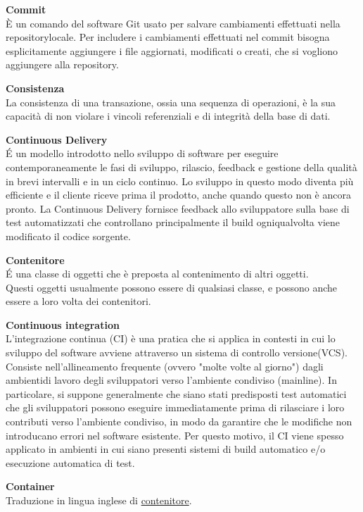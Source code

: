 \documentclass[a4paper, oneside, openany, dvipsnames, table, 12pt]{article}
\begin{document}
\textbf{Commit} \\
È un comando del software Git usato per salvare cambiamenti effettuati nella repository\glo locale. Per includere i cambiamenti effettuati nel commit bisogna esplicitamente aggiungere i file aggiornati, modificati o creati, che si vogliono aggiungere alla repository.

\textbf{Consistenza} \\
La consistenza di una transazione, ossia una sequenza di operazioni, è la sua capacità di non violare i vincoli referenziali e di integrità della base di dati.

\textbf{Continuous Delivery} \\
\'E un modello introdotto nello sviluppo di software per eseguire contemporaneamente le fasi di sviluppo, rilascio, feedback e gestione della qualità in brevi intervalli e in un ciclo continuo. Lo sviluppo in questo modo diventa più efficiente e il cliente riceve prima il prodotto, anche quando questo non è ancora pronto. La Continuous Delivery fornisce feedback allo sviluppatore sulla base di test automatizzati che controllano principalmente il build ogniqualvolta viene modificato il codice sorgente.

\label{par:container}
\textbf{Contenitore} \\
\'E una classe di oggetti che è preposta al contenimento di altri oggetti. \\ 
Questi oggetti usualmente possono essere di qualsiasi classe, e possono anche essere a loro volta dei contenitori.

\textbf{Continuous integration} \\
L'integrazione continua (CI) è una pratica che si applica in contesti in cui lo sviluppo del software avviene attraverso un sistema di controllo versione\glo (VCS\glo). Consiste nell'allineamento frequente (ovvero "molte volte al giorno") dagli ambienti\glo di lavoro degli sviluppatori verso l'ambiente condiviso (mainline).
In particolare, si suppone generalmente che siano stati predisposti test automatici che gli sviluppatori possono eseguire immediatamente prima di rilasciare i loro contributi verso l'ambiente condiviso, in modo da garantire che le modifiche non introducano errori nel software esistente. Per questo motivo, il CI viene spesso applicato in ambienti in cui siano presenti sistemi di build automatico e/o esecuzione automatica di test.


\textbf{Container} \\
Traduzione in lingua inglese di \hyperref[par:container]{contenitore\glo}.
\end{document}
